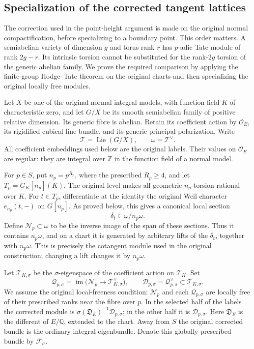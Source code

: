 \subsection{Specialization of the corrected tangent lattices}
\label{sec:geometry-hodge-specialization}

The correction used in the point-height argument is made on the original
normal compactification, before specializing to a boundary point. This
order matters. A semiabelian variety of dimension $g$ and torus rank $r$
has $p$-adic Tate module of rank $2g-r$. Its intrinsic torsion cannot be
substituted for the rank-$2g$ torsion of the generic abelian family.
We prove the required comparison by applying the finite-group
Hodge--Tate theorem on the original charts and then specializing the
original locally free modules.

Let $X$ be one of the original normal integral models, with function
field $K$ of characteristic zero, and let $G/X$ be its smooth
semiabelian family of positive relative dimension. Its generic fibre
is abelian. Retain its coefficient
action by $\mathcal O_E$, its rigidified cubical line bundle, and its
generic principal polarization. Write
\[
 \mathcal T=\operatorname{Lie}(G/X),\qquad
 \omega=\mathcal T^\vee.
\]
All coefficient embeddings used below are the original labels. Their
values on $\mathcal O_E$ are regular: they are integral over $\mathbb Z$
in the function field of a normal model.

For $p\in S$, put $n_p=p^{R_p}$, where the prescribed $R_p\ge4$,
and let $T_p=G_K[n_p](K)$. The original level makes all geometric
$n_p$-torsion rational over $K$. For $t\in T_p$, differentiate at the
identity the original Weil character $e_{n_p}(t,-)$ on $G[n_p]$.
As proved below, this gives a canonical local section
\[
 \delta_t\in\omega/n_p\omega.
\]
Define $\mathcal N_p\subset\omega$ to be the inverse image of the
span of these sections. Thus it contains $n_p\omega$, and on a chart
it is generated by arbitrary lifts of the $\delta_t$, together with
$n_p\omega$. This is precisely the cotangent module used in the
original construction; changing a lift changes it by $n_p\omega$.

Let $\mathcal T_{K,\sigma}$ be the $\sigma$-eigenspace of the
coefficient action on $\mathcal T_K$. Set
\[
 \mathcal Q_{p,\sigma}
   =\operatorname{im}\bigl(\mathcal N_p\longrightarrow
                          \mathcal T_{K,\sigma}^{\vee}\bigr),
 \qquad
 \mathcal D_{p,\sigma}=\mathcal Q_{p,\sigma}^{\vee}
       \subset\mathcal T_{K,\sigma}.
 \tag{HS1}
\]
We assume the original local-freeness condition: $\mathcal N_p$ and
each $\mathcal Q_{p,\sigma}$ are locally free of their prescribed
ranks near the fibre over $p$. In the selected half of the labels the
corrected module is
$\sigma(\mathfrak D_E)^{-1}\mathcal D_{p,\sigma}$; in the other
half it is $\mathcal D_{p,\sigma}$. Here $\mathfrak D_E$ is the
different of $E/\mathbb Q$, extended to the chart. Away from $S$ the
original corrected bundle is the ordinary integral eigenbundle.
Denote this globally prescribed bundle by $\mathcal F_\sigma$.

